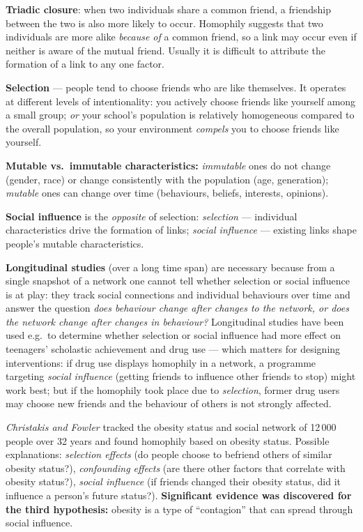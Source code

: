 \documentclass[11pt,a4paper]{article}
\theoremstyle{definition}
\providecommand{\uv}[1]{``#1''}
\begin{document}
\begin{defbox}
\textbf{Triadic closure}: when two individuals share a common friend, a friendship between the two is
also more likely to occur. Homophily suggests that two individuals are more alike \emph{because of} a
common friend, so a link may occur even if neither is aware of the mutual friend. Usually it is
difficult to attribute the formation of a link to any one factor.

\textbf{Selection} --- people tend to choose friends who are like themselves. It operates at
different levels of intentionality: you actively choose friends like yourself among a small group;
\emph{or} your school's population is relatively homogeneous compared to the overall population, so
your environment \emph{compels} you to choose friends like yourself.

\textbf{Mutable vs.\ immutable characteristics:} \emph{immutable} ones do not change (gender, race) or
change consistently with the population (age, generation); \emph{mutable} ones can change over time
(behaviours, beliefs, interests, opinions).

\textbf{Social influence} is the \emph{opposite} of selection: \emph{selection} --- individual
characteristics drive the formation of links; \emph{social influence} --- existing links shape
people's mutable characteristics.
\end{defbox}

\textbf{Longitudinal studies} (over a long time span) are necessary because from a single snapshot of
a network one cannot tell whether selection or social influence is at play: they track social
connections and individual behaviours over time and answer the question \emph{does behaviour change
after changes to the network, or does the network change after changes in behaviour?} Longitudinal
studies have been used e.g.\ to determine whether selection or social influence had more effect on
teenagers' scholastic achievement and drug use --- which matters for designing interventions: if drug
use displays homophily in a network, a programme targeting \emph{social influence} (getting friends
to influence other friends to stop) might work best; but if the homophily took place due to
\emph{selection}, former drug users may choose new friends and the behaviour of others is not
strongly affected.

\emph{Christakis and Fowler} tracked the obesity status and social network of 12\,000 people over 32
years and found homophily based on obesity status. Possible explanations: \emph{selection effects}
(do people choose to befriend others of similar obesity status?), \emph{confounding effects} (are
there other factors that correlate with obesity status?), \emph{social influence} (if friends changed
their obesity status, did it influence a person's future status?). \textbf{Significant evidence was
discovered for the third hypothesis:} obesity is a type of \uv{contagion} that can spread through
social influence.
\end{document}
